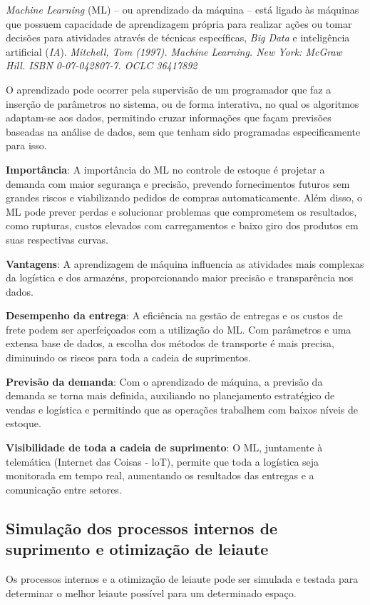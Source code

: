 \documentclass{amsart}
\begin{document}
{\it Machine Learning} (ML) – ou aprendizado da máquina – está ligado às máquinas que possuem capacidade de aprendizagem própria para realizar ações ou tomar decisões para atividades através de técnicas específicas, {\it Big Data} e inteligência artificial ({\it IA}). {\it Mitchell, Tom (1997). Machine Learning. New York: McGraw Hill. ISBN 0-07-042807-7. OCLC 36417892}  

O aprendizado pode ocorrer pela supervisão de um programador que faz a inserção de parâmetros no sistema, ou de forma interativa, no qual os algoritmos adaptam-se aos dados, permitindo cruzar informações que façam previsões baseadas na análise de dados, sem que tenham sido programadas especificamente para isso.

{\bf Importância}: A importância do ML no controle de estoque é projetar a demanda com maior segurança e precisão, prevendo fornecimentos futuros sem grandes riscos e viabilizando pedidos de compras automaticamente. Além disso, o ML pode prever perdas e solucionar problemas que comprometem os resultados, como rupturas, custos elevados com carregamentos e baixo giro dos produtos em suas respectivas curvas.

{\bf Vantagens}: A aprendizagem de máquina influencia as atividades mais complexas da logística e dos armazéns, proporcionando maior precisão e transparência nos dados.

{\bf Desempenho da entrega}: A eficiência na gestão de entregas e os custos de frete podem ser aperfeiçoados com a utilização do ML. Com parâmetros e uma extensa base de dados, a escolha dos métodos de transporte é mais precisa, diminuindo os riscos para toda a cadeia de suprimentos.

{\bf Previsão da demanda}: Com o aprendizado de máquina, a previsão da demanda se torna mais definida, auxiliando no planejamento estratégico de vendas e logística e permitindo que as operações trabalhem com baixos níveis de estoque.

{\bf Visibilidade de toda a cadeia de suprimento}: O ML, juntamente à telemática (Internet das Coisas - loT), permite que toda a logística seja monitorada em tempo real, aumentando os resultados das entregas e a comunicação entre setores.

\subsection{Simulação dos processos internos de suprimento e otimização de leiaute}

Os processos internos e a otimização de leiaute pode ser simulada e testada para determinar o melhor leiaute possível para um determinado espaço.
\end{document}
